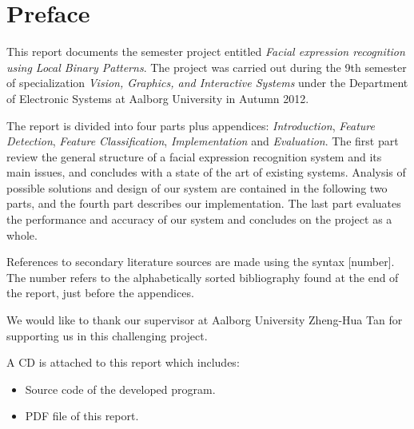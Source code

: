 \thispagestyle{plain}
\hypersetup{bookmarksdepth=-2}
\chapter*{Preface}
\hypersetup{bookmarksdepth}%

\noindent This report documents the semester project entitled \textit{Facial expression recognition using Local Binary Patterns}. The project was carried out during the 9th semester of specialization \textit{Vision, Graphics, and Interactive Systems} under the Department of Electronic Systems at Aalborg University in Autumn 2012. 
\newline

\noindent The report is divided into four parts plus appendices: \textit{Introduction}, \textit{Feature Detection}, \textit{Feature Classification}, \textit{Implementation} and \textit{Evaluation}. The first part review the general structure of a facial expression recognition system and its main issues, and concludes with a state of the art of existing systems. Analysis of possible solutions and design of our system are contained in the following two parts, and the fourth part describes our implementation. The last part evaluates the performance and accuracy of our system and concludes on the project as a whole. 
\newline

\noindent References to secondary literature sources are made using the syntax [number]. The number refers to the alphabetically sorted bibliography found at the end of the report, just before the appendices.
\newline

\noindent We would like to thank our supervisor at Aalborg University Zheng-Hua Tan for supporting us in this challenging project. 
\newline

\noindent A CD is attached to this report which includes:
\begin{itemize}
\item Source code of the developed program.
\item PDF file of this report.
\end{itemize}

